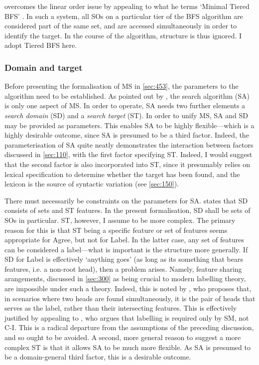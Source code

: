\textcite{MilwayD_2021} overcomes the linear order issue by appealing to what he terms `Minimal Tiered BFS' \parencite[15]{MilwayD_2021}. In such a system, all SOs on a particular tier of the BFS algorithm are considered part of the same set, and are accessed simultaneously in order to identify the target. In the course of the algorithm, structure is thus ignored. I adopt Tiered BFS here.

\subsubsection{Domain and target}\label{sec:452}

Before presenting the formalisation of MS in \autoref{sec:453}, the parameters to the algorithm need to be established. As pointed out by \textcite{KeH_2019}, the search algorithm (SA) is only one aspect of MS. In order to operate, SA needs two further elements a \textit{search domain} (SD) and a \textit{search target} (ST). In order to unify MS, SA and SD may be provided as parameters. This enables SA to be highly flexible---which is a highly desirable outcome, since SA is presumed to be a third factor. Indeed, the parameterisation of SA quite neatly demonstrates the interaction between factors discussed in \autoref{sec:110}, with the first factor specifying ST. Indeed, I would suggest that the second factor is also incorporated into ST, since it presumably relies on lexical specification to determine whether the target has been found, and the lexicon is the source of syntactic variation (see \autoref{sec:150}).

There must necessarily be constraints on the parameters for SA. \textcite[44]{KeH_2019} states that SD consists of sets and ST features. In the present formalisation, SD shall be sets of SOs in particular. ST, however, I assume to be more complex. The primary reason for this is that ST being a specific feature or set of features seems appropriate for Agree, but not for Label. In the latter case, any set of features can be considered a label---what is important is the structure more generally. If SD for Label is effectively `anything goes' (as long as its something that bears features, i.e. a non-root head), then a problem arises. Namely, feature sharing arangements, discussed in \autoref{sec:300} as being crucial to modern labelling theory, are impossible under such a theory. Indeed, this is noted by \textcite{KeH_2019}, who proposes that, in scenarios where two heads are found simultaneously, it is the pair of heads that serves as the label, rather than their intersecting features. This is effectively justified by appealing to \textcite{TakitaK_2020}, who argues that labelling is required only by SM, not C-I. This is a radical departure from the assumptions of the preceding discussion, and so ought to be avoided. A second, more general reason to suggest a more complex ST is that it allows SA to be much more flexible. As SA is presumed to be a domain-general third factor, this is a desirable outcome.

